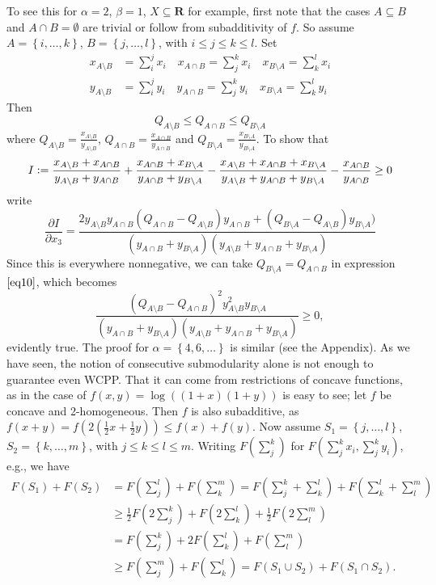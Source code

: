 \documentclass{article}
\theoremstyle{case}
\begin{document}
To see this for $\alpha = 2$, $\beta = 1$, $X \subseteq \mathbf{R}$ for example, first note that the cases $A \subseteq B$ and $A\cap B = \emptyset$ are trivial or follow from subadditivity of $f$. So assume $A = \left\lbrace i, \dots, k\right\rbrace$, $B = \left\lbrace j, \dots, l\right\rbrace$, with $i \leq j \leq k \leq l$. Set 
\begin{align} \label{eq10}
x_{A\setminus B} &= \sum_i^jx_i \quad x_{A\cap B} = \sum_j^kx_i \quad x_{B\setminus A}=\sum_k^lx_i \\
y_{A\setminus B} &= \sum_i^jy_i \quad y_{A\cap B} = \sum_j^ky_i \quad x_{B\setminus A}=\sum_k^ly_i
\end{align}
Then
\[
Q_{A\setminus B} \leq Q_{A\cap B} \leq Q_{B\setminus A}
\]
where $Q_{A\setminus B} = \frac{x_{A\setminus B}}{y_{A\setminus B}}$,  $Q_{A\cap B} = \frac {x_{A\cap B}}{y_{A\cap B}}$ and $Q_{B\setminus A} = \frac{x_{B\setminus A}}{y_{B\setminus A}}$.
To show that 
\[
I \vcentcolon= \frac{x_{A\setminus B}+x_{A\cap B}}{y_{A\setminus B}+y_{A\cap B}} + \frac{x_{A\cap B}+x_{B\setminus A}}{y_{A\cap B}+y_{B\setminus A}} - \frac{x_{A\setminus B}+x_{A\cap B}+x_{B\setminus A}}{y_{A\setminus B}+y_{A\cap B}+y_{B\setminus A}} - \frac{x_{A\cap B}}{y_{A\cap B}} \geq 0
\]
write 
\[
\frac{\partial I}{\partial x_3} = \frac{2y_{A\setminus B}y_{A\cap B}(Q_{A\cap B}-Q_{A\setminus B})y_{A\cap B}+(Q_{B\setminus A}-Q_{A\setminus B})y_{B\setminus A})}{(y_{A\cap B}+y_{B\setminus A})(y_{A\setminus B}+y_{A\cap B}+y_{B\setminus A})}
\]
Since this is everywhere nonnegative, we can take $Q_{B\setminus A} = Q_{A\cap B}$ in expression $\ref{eq10}$, which becomes
\[
\frac{(Q_{A\setminus B} - Q_{A\cap B})^2y_{A\setminus B}^2y_{B\setminus A}}{(y_{A\cap B}+y_{B\setminus A})(y_{A\setminus B}+y_{A\cap B}+y_{B\setminus A})} \geq 0,
\]
evidently true. The proof for $\alpha = \left\lbrace 4, 6, \dots \right\rbrace$ is similar (see the Appendix). As we have seen, the notion of consecutive submodularity alone is not enough to guarantee even WCPP. That it can come from restrictions of concave functions, as in the case of $f(x,y) = \log{((1+x)(1+y))}$ is easy to see; let $f$ be concave and 2-homogeneous. Then $f$ is also subadditive, as $f(x+y) = f(2(\frac{1}{2}x + \frac{1}{2}y)) \leq f(x)+f(y)$. Now assume $S_1 = \left\lbrace j, \dots, l\right\rbrace$, $S_2 = \left\lbrace k, \dots, m\right\rbrace$, with $j \leq k \leq l \leq m$. Writing $F(\sum_j^k)$ for $F(\sum_j^kx_i, \sum_j^ky_i)$, e.g., we have
\begin{align*}
F(S_1)+F(S_2) &= F(\sum_j^l)+F(\sum_k^m) = F(\sum_j^k+\sum_k^l)+F(\sum_k^l+\sum_l^m) \\
&\geq \frac{1}{2}F(2\sum_j^k)+F(2\sum_k^l)+\frac{1}{2}F(2\sum_l^m) \\
&=F(\sum_j^k)+2F(\sum_k^l)+F(\sum_l^m) \\
&\geq F(\sum_j^m)+F(\sum_k^l) = F(S_1\cup S_2)+F(S_1\cap S_2).
\end{align*} 
\end{document}
